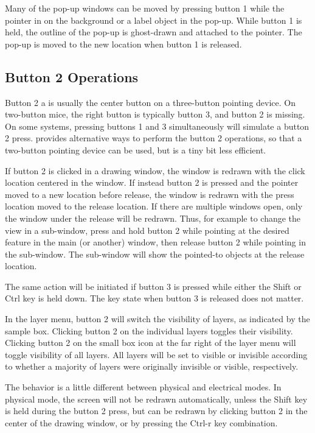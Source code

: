 Many of the pop-up windows can be moved by pressing button 1 while
the pointer in on the background or a label object in the pop-up.
While button 1 is held, the outline of the pop-up is ghost-drawn and
attached to the pointer.  The pop-up is moved to the new location when
button 1 is released.

\subsection{Button 2 Operations}
Button 2 a is usually the center button on a three-button pointing
device.  On two-button mice, the right button is typically button 3,
and button 2 is missing.  On some systems, pressing buttons 1 and 3
simultaneously will simulate a button 2 press.  {\Xic} provides
alternative ways to perform the button 2 operations, so that a
two-button pointing device can be used, but is a tiny bit less
efficient.

If button 2 is clicked in a drawing window, the window is redrawn with
the click location centered in the window.  If instead button 2 is
pressed and the pointer moved to a new location before release, the
window is redrawn with the press location moved to the release
location.  If there are multiple windows open, only the window under
the release will be redrawn.  Thus, for example to change the view in
a sub-window, press and hold button 2 while pointing at the desired
feature in the main (or another) window, then release button 2 while
pointing in the sub-window.  The sub-window will show the pointed-to
objects at the release location.

The same action will be initiated if button 3 is pressed while either
the {\kb Shift} or {\kb Ctrl} key is held down.  The key state when
button 3 is released does not matter.

In the layer menu, button 2 will switch the visibility of layers, as
indicated by the sample box.  Clicking button 2 on the individual
layers toggles their visibility.  Clicking button 2 on the small box
icon at the far right of the layer menu will toggle visibility of all
layers.  All layers will be set to visible or invisible according to
whether a majority of layers were originally invisible or visible,
respectively.

The behavior is a little different between physical and electrical
modes.  In physical mode, the screen will not be redrawn
automatically, unless the {\kb Shift} key is held during the button 2
press, but can be redrawn by clicking button 2 in the center of the
drawing window, or by pressing the {\kb Ctrl-r} key combination.

